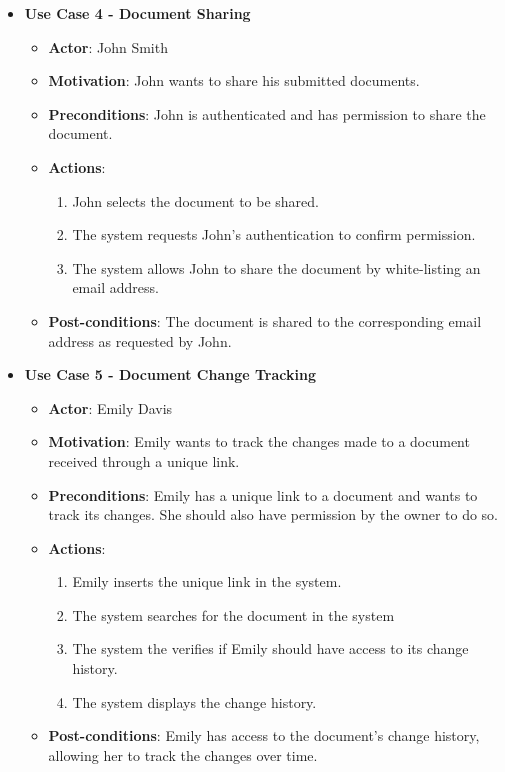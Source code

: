 \documentclass[a4paper,11pt]{article}
\begin{document}
\begin{itemize}
                    \pagebreak
                    \item \textbf{Use Case 4 - Document Sharing}
                    \begin{itemize}
                        \item \textbf{Actor}: John Smith
                        \item \textbf{Motivation}: John wants to share his submitted documents.
                        \item \textbf{Preconditions}: John is authenticated and has permission to share the document.
                        \item \textbf{Actions}:
                        \begin{enumerate}
                            \item John selects the document to be shared.
                            \item The system requests John’s authentication to confirm permission.
                            \item The system allows John to share the document by white-listing an email address.
                        \end{enumerate}
                        \item \textbf{Post-conditions}: The document is shared to the corresponding email address as requested by John.
                    \end{itemize}
                    
                    \item \textbf{Use Case 5 - Document Change Tracking}
                    \begin{itemize}
                        \item \textbf{Actor}: Emily Davis
                        \item \textbf{Motivation}: Emily wants to track the changes made to a document received through a unique link.
                        \item \textbf{Preconditions}: Emily has a unique link to a document and wants to track its changes. She should also have permission by the owner to do so.
                        \item \textbf{Actions}:
                        \begin{enumerate}
                            \item Emily inserts the unique link in the system.
                            \item The system searches for the document in the system
                            \item The system the verifies if Emily should have access to its change history.
                            \item The system displays the change history.
                        \end{enumerate}
                        \item \textbf{Post-conditions}: Emily has access to the document’s change history, allowing her to track the changes over time.
                    \end{itemize}
                            

\end{itemize}
\end{document}
